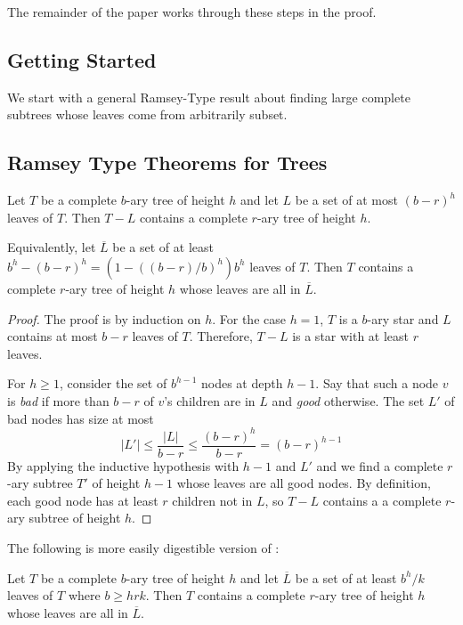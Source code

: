 \documentclass[kpfonts]{patmorin}
\begin{document}
The remainder of the paper works through these steps in the proof.


\subsection{Getting Started}


We start with a general Ramsey-Type result about finding large complete subtrees whose leaves come from arbitrarily subset.

\subsection{Ramsey Type Theorems for Trees}

\begin{lem}
  Let $T$ be a complete $b$-ary tree of height $h$ and let $L$ be a set of at most $(b-r)^h$ leaves of $T$.  Then $T-L$ contains a complete $r$-ary tree of height $h$.
  
  Equivalently, let $\overline{L}$ be a set of at least $b^h-(b-r)^h=(1-((b-r)/b)^h)b^h$ leaves of $T$.  Then $T$ contains a complete $r$-ary tree of height $h$ whose leaves are all in $\overline{L}$.
\end{lem}

\begin{proof}
  The proof is by induction on $h$.  For the case $h=1$, $T$ is a $b$-ary star and $L$ contains at most $b-r$ leaves of $T$.  Therefore, $T-L$ is a star with at least $r$ leaves.
  
  For $h\ge 1$, consider the set of $b^{h-1}$ nodes at depth $h-1$.  Say that such a node $v$ is \emph{bad} if more than $b-r$ of $v$'s children are in $L$ and \emph{good} otherwise.  The set $L'$ of bad nodes has size at most
  \[  |L'|\le \frac{|L|}{b-r} \le \frac{(b-r)^h}{b-r} = (b-r)^{h-1} \]
  By applying the inductive hypothesis with $h-1$ and $L'$ and we find a complete $r$-ary subtree $T'$ of height $h-1$ whose leaves are all good nodes.  By definition, each good node has at least $r$ children not in $L$, so $T-L$ contains a a complete $r$-ary subtree of height $h$.
\end{proof}

The following is more easily digestible version of :

\begin{cor}
  Let $T$ be a complete $b$-ary tree of height $h$ and let
  $\overline{L}$ be a set of at least $b^{h}/k$ leaves of $T$ where $b\ge hrk$.  Then $T$ contains a complete $r$-ary tree of height $h$ whose leaves are all in $\overline{L}$.
\end{cor}
\end{document}
